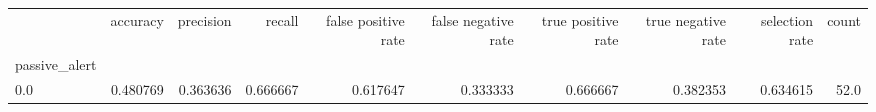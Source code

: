 \begin{tabular}{lrrrrrrrrr}
\toprule
{} &  accuracy &  precision &    recall &  false positive rate &  false negative rate &  true positive rate &  true negative rate &  selection rate &  count \\
passive\_alert &           &            &           &                      &                      &                     &                     &                 &        \\
\midrule
0.0           &  0.480769 &   0.363636 &  0.666667 &             0.617647 &             0.333333 &            0.666667 &            0.382353 &        0.634615 &   52.0 \\
\bottomrule
\end{tabular}
